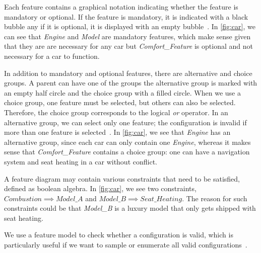Each feature contains a graphical notation indicating whether the feature is mandatory or optional. 
If the feature is mandatory, it is indicated with a black bubble any if it is optional, it is displayed with an empty bubble~\cite{Feature-Oriented-Software-Product-Lines}. 
In \autoref{fig:car}, we can see that \textit{Engine} and \textit{Model} are mandatory features, which make sense given that they are are necessary for any car 
but \textit{Comfort\_Feature} is optional and not necessary for a car to function.

In addition to mandatory and optional features, there are alternative and choice groups. 
A parent can have one of the groups the alternative group is marked with an empty half circle and the choice group with a filled circle. 
When we use a choice group, one feature must be selected, but others can also be selected. Therefore, the choice group corresponds to the logical \textit{or} operator. 
In an alternative group, we can select only one feature; the configuration is invalid if more than one feature is selected~\cite{Feature-Oriented-Software-Product-Lines}. 
In \autoref{fig:car}, we see that \textit{Engine} has an alternative group, since each car can only contain one \textit{Engine}, 
whereas it makes sense that \textit{Comfort\_Feature} contains a choice group: one can have a navigation system and seat heating in a car without conflict.

A feature diagram may contain various constraints that need to be satisfied, defined as boolean algebra. In \autoref{fig:car}, we see two constraints, 
$Combustion \implies Model\_A$ and $Model\_B \implies Seat\_Heating$. The reason for such constraints could be that \textit{Model\_B} 
is a luxury model that only gets shipped with seat heating.

We use a feature model to check whether a configuration 
is valid, which is particularly useful if we want to sample or enumerate all valid configurations~\cite{Feature-Oriented-Software-Product-Lines}. 